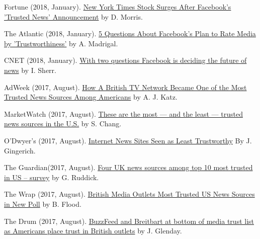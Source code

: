 \begin{bibenum}
    \item[] Fortune (2018, January).
      \href{http://fortune.com/2018/01/21/new-york-times-stock-facebooks-trusted-news/}{New York Times Stock Surges After Facebook's 'Trusted News' Announcement} by D. Morris.
    \item[] The Atlantic (2018, January).
      \href{https://www.theatlantic.com/technology/archive/2018/01/facebook-media-trustworthiness/551045/}{5 Questions About Facebook's Plan to Rate Media by 'Trustworthiness'} by A. Madrigal.
    \item[] CNET (2018, January).
      \href{https://www.cnet.com/news/with-two-questions-facebook-is-deciding-the-future-of-news-zuckerberg-fake-news/}{With two questions Facebook is deciding the future of news} by I. Sherr.
    \item[] AdWeek (2017, August).
      \href{http://www.adweek.com/tvnewser/how-a-british-tv-network-became-one-of-the-most-trusted-news-sources-among-americans/339872}{How A British TV Network Became One of the Most Trusted News Sources Among Americans} by A. J. Katz.
    \item[] MarketWatch (2017, August).
      \href{https://www.marketwatch.com/story/these-are-the-most-and-the-least-trusted-news-sources-in-the-us-2017-08-03}{These are the most — and the least — trusted news sources in the U.S.} by S. Chang.
    \item[] O'Dwyer's (2017, August).
      \href{http://www.odwyerpr.com/story/public/9210/2017-08-08/internet-news-sites-seen-as-least-trustworthy.html}{Internet News Sites Seen as Least Trustworthy} By J. Gingerich.
    \item[] The Guardian(2017, August).
      \href{https://www.theguardian.com/media/2017/aug/09/four-uk-news-sources-among-top-10-most-trusted-in-us-survey}{Four UK news sources among top 10 most trusted in US – survey} by G. Ruddick.
    \item[] The Wrap (2017, August).
      \href{https://www.thewrap.com/british-media-outlets-most-trusted-us-news-sources-in-new-poll/}{British Media Outlets Most Trusted US News Sources in New Poll} by B. Flood.
    \item[] The Drum (2017, August).
      \href{http://www.thedrum.com/news/2017/08/08/buzzfeed-and-breitbart-bottom-media-trust-list-americans-place-trust-british-outlets}{BuzzFeed and Breitbart at bottom of media trust list as Americans place trust in British outlets} by J. Glenday.
  \end{bibenum}
